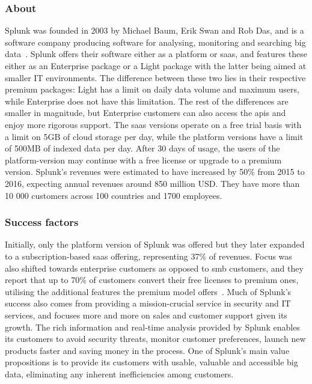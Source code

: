 \subsubsection{About}
Splunk was founded in 2003 by Michael Baum, Erik Swan and Rob Das, and is a software company producing software for analysing, monitoring and searching big data~\cite{derrickharris2010}. Splunk offers their software either as a platform or \gls{saas}, and features these either as an Enterprise package or a Light package with the latter being aimed at smaller IT environments. The difference between these two lies in their respective premium packages: Light has a limit on daily data volume and maximum users, while Enterprise does not have this limitation. The rest of the differences are smaller in magnitude, but Enterprise customers can also access the \glspl{api} and enjoy more rigorous support. The \gls{saas} versions operate on a free trial basis with a limit on 5GB of cloud storage per day, while the platform versions have a limit of 500MB of indexed data per day. After 30 days of usage, the users of the platform-version may continue with a free license or upgrade to a premium version. Splunk's revenues were estimated to have increased by 50\% from 2015 to 2016, expecting annual revenues around 850 million USD. They have more than 10 000 customers across 100 countries and 1700 employees.


\subsubsection{Success factors}
Initially, only the platform version of Splunk was offered but they later expanded to a subscription-based \gls{saas} offering, representing 37\% of revenues. Focus was also shifted towards enterprise customers as opposed to \gls{smb} customers, and they report that up to 70\% of customers convert their free licenses to premium ones, utilising the additional features the premium model offers~\cite{philiplay2014}. Much of Splunk's success also comes from providing a mission-crucial service in security and IT services, and focuses more and more on sales and customer support given its growth. The rich information and real-time analysis provided by Splunk enables its customers to avoid security threats, monitor customer preferences, launch new products faster and saving money in the process. One of Splunk's main value propositions is to provide its customers with usable, valuable and accessible big data, eliminating any inherent inefficiencies among customers. 